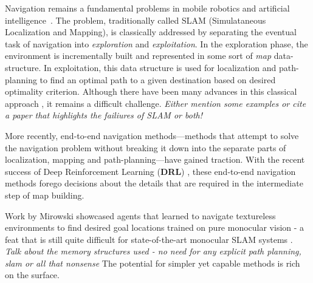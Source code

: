 
Navigation remains a fundamental problems in mobile robotics and artificial intelligence~\cite{SmChIJRR1986,ElCOMPUTER1980}.
The problem, traditionally called SLAM (Simulataneous Localization and Mapping), is classically addressed by separating the eventual task of navigation into \textit{exploration} and \textit{exploitation}. In the exploration phase, the environment is incrementally built and represented in some sort of \emph{map} data-structure. In exploitation, this data structure is used for localization and path-planning to find an optimal path to a given destination based on desired optimality criterion.  Although there have been many advances in this classical approach \cite{XXX}, it remains a difficult challenge. \textit{Either mention some examples or cite a paper that highlights the failiures of SLAM or both!} 

%
More recently, end-to-end navigation methods---methods that attempt to  
solve the navigation problem without breaking it down into the separate parts of localization, mapping and path-planning---have gained traction.
With the recent success of Deep Reinforcement Learning (\textbf{DRL}) \cite{MnKaSiNATURE2015,MnKaSiNATURE2015}, these end-to-end navigation methods \cite{MnBaMiICML2016,SiHuMaNATURE2016,LePaKrISER2017,MiPaViICLR2017,OhChSiICML2016} forego decisions about the details that are required in the intermediate step of map building.  

Work by Mirowski \etal{} showcased agents that learned to navigate textureless environments to find desired goal locations trained on pure monocular vision - a feat that is still quite difficult for state-of-the-art monocular SLAM systems \cite{XXX}. \textit{Talk about the memory structures used - no need for any explicit path planning, slam or all that nonsense} 
The potential for simpler yet capable methods is rich on the surface.

